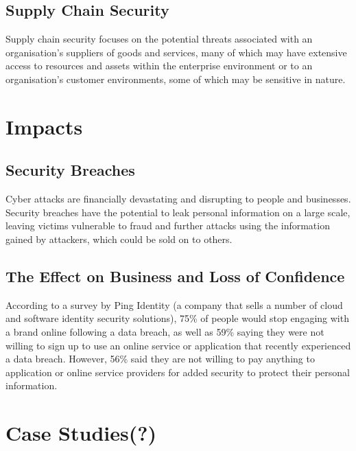     \subsection{Supply Chain Security}
        Supply chain security focuses on the potential threats associated with an organisation’s suppliers of goods and services, many of which may have extensive access to resources and assets within the enterprise environment or to an organisation’s customer environments, some of which may be sensitive in nature. \cite{CombattingCyberRisks}

\section{Impacts}

    \subsection{Security Breaches}
        Cyber attacks are financially devastating and disrupting to people and businesses. Security breaches have the potential to leak personal information on a large scale, leaving victims vulnerable to fraud \cite{CyberCrime} and further attacks using the information gained by attackers, which could be sold on to others.
    
    \subsection{The Effect on Business and Loss of Confidence}
        According to a survey by Ping Identity (a company that sells a number of cloud and software identity security solutions), 75\% of people would stop engaging with a brand online following a data breach, as well as 59\% saying they were not willing to sign up to use an online service or application that recently experienced a data breach. However, 56\% said they are not willing to pay anything to application or online service providers for added security to protect their personal information. \cite{ITGovernance}


\section{Case Studies(?)}
